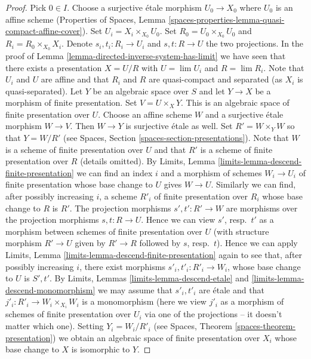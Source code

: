 \documentclass{stacks-project}
\theoremstyle{plain}
\theoremstyle{definition}
\theoremstyle{remark}
\numberwithin{equation}{subsection}
\def\lim{\mathop{\mathrm{lim}}\nolimits}
\begin{document}
\begin{proof}
Pick $0 \in I$. Choose a surjective \'etale morphism $U_0 \to X_0$ where
$U_0$ is an affine scheme (Properties of Spaces, Lemma
\ref{spaces-properties-lemma-quasi-compact-affine-cover}).
Set $U_i = X_i \times_{X_0} U_0$. Set $R_0 = U_0 \times_{X_0} U_0$ and
$R_i = R_0 \times_{X_0} X_i$. Denote $s_i, t_i : R_i \to U_i$ and
$s, t : R \to U$ the two projections. In the proof of
Lemma \ref{lemma-directed-inverse-system-has-limit} we have
seen that there exists a presentation $X = U/R$ with
$U = \lim U_i$ and $R = \lim R_i$. Note that $U_i$ and $U$ are affine and
that $R_i$ and $R$ are quasi-compact and separated (as $X_i$ is
quasi-separated). Let $Y$ be an algebraic space over $S$ and let
$Y \to X$ be a morphism of finite presentation. Set $V = U \times_X Y$.
This is an algebraic space of finite presentation over $U$.
Choose an affine scheme $W$ and a surjective \'etale morphism $W \to V$.
Then $W \to Y$ is surjective \'etale as well. Set $R' = W \times_Y W$
so that $Y = W/R'$ (see Spaces, Section \ref{spaces-section-presentations}).
Note that $W$ is a scheme of finite presentation over $U$ and that $R'$
is a scheme of finite presentation over $R$ (details omitted).
By Limits, Lemma \ref{limits-lemma-descend-finite-presentation}
we can find an index $i$ and a morphism of schemes $W_i \to U_i$ of
finite presentation whose base change to $U$ gives $W \to U$. Similarly
we can find, after possibly increasing $i$, a scheme $R'_i$ of finite
presentation over $R_i$ whose base change to $R$ is $R'$.
The projection morphisms $s', t' : R' \to W$ are morphisms over
the projection morphisms $s, t : R \to U$. Hence we can view $s'$,
resp.\ $t'$ as a morphism between schemes of finite presentation over
$U$ (with structure morphism $R' \to U$ given by $R' \to R$ followed
by $s$, resp.\ $t$). Hence we can apply
Limits, Lemma \ref{limits-lemma-descend-finite-presentation}
again to see that, after possibly increasing $i$, there exist
morphisms $s'_i, t'_i : R'_i \to W_i$, whose base change to $U$
is $S', t'$. By Limits, Lemmas \ref{limits-lemma-descend-etale} and
\ref{limits-lemma-descend-monomorphism}
we may assume that $s'_i, t'_i$ are \'etale and that
$j'_i : R'_i \to W_i \times_{X_i} W_i$ is a monomorphism (here we
view $j'_i$ as a morphism of schemes of finite presentation over $U_i$ via
one of the projections -- it doesn't matter which one). Setting
$Y_i = W_i/R'_i$ (see Spaces, Theorem \ref{spaces-theorem-presentation})
we obtain an algebraic space of finite presentation
over $X_i$ whose base change to $X$ is isomorphic to $Y$.


\end{proof}
\end{document}
